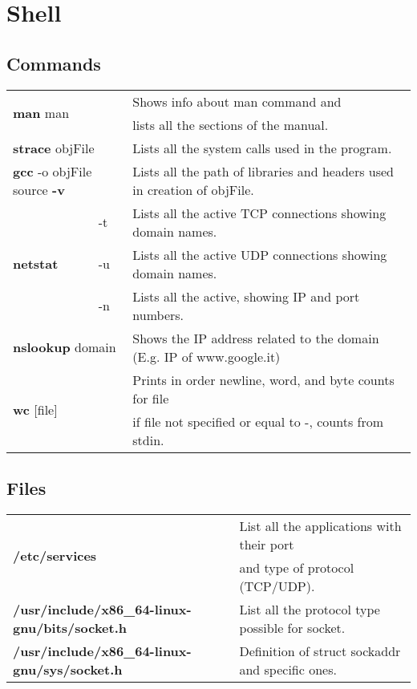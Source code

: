 \chapter{Shell}

\section{Commands}

\begin{table}[h]
\centering
\footnotesize
\begin{tabular}{|l|l|l|}
\hline
\multicolumn{2}{|l|}{\multirow{2}{*}{\textbf{man} man}}&{Shows info about man command and}\\
\multicolumn{2}{|l|}{} & {lists all the sections of the manual.}\\
\hline
\multicolumn{2}{|l|}{\textbf{strace} objFile} & {Lists all the system calls used in the program.}\\
\hline
\multicolumn{2}{|l|}{\textbf{gcc} -o objFile source \textbf{-v}} & {Lists all the path of libraries and headers used in creation of objFile.}\\
\hline
\multirow{3}{*}{\textbf{netstat}} & {-t} & {Lists all the active TCP connections showing domain names.}\\
\cline{2-3}
& {-u} & {Lists all the active UDP connections showing domain names.}\\
\cline{2-3}
& {-n} & {Lists all the active, showing IP and port numbers.}\\
\hline
\multicolumn{2}{|l|}{\textbf{nslookup} domain} & {Shows the IP address related to the domain (E.g. IP of www.google.it)}\\
\hline
\multicolumn{2}{|l|}{\multirow{2}{*}{\textbf{wc} [file]}} & {Prints in order newline, word, and byte counts for file}\\
\multicolumn{2}{|l|}{} & {if file not specified or equal to -, counts from stdin.}\\
\hline
\end{tabular}
\end{table}


\section{Files}\label{files}
\begin{table}[h]
\centering
\footnotesize
\begin{tabular}{|l|l|}
\hline
\multirow{2}{*}{\textbf{/etc/services}} & {List all the applications with their port}\\
& {and type of protocol (TCP/UDP).}\\
\hline
{\textbf{/usr/include/x86\_64-linux-gnu/bits/socket.h}} & {List all the protocol type possible for socket.}\\
\hline
{\textbf{/usr/include/x86\_64-linux-gnu/sys/socket.h}} & {Definition of struct sockaddr and specific ones.}\\
\hline
\end{tabular}
\end{table}

